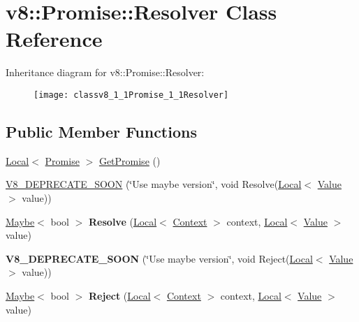 \hypertarget{classv8_1_1Promise_1_1Resolver}{}\section{v8\+:\+:Promise\+:\+:Resolver Class Reference}
\label{classv8_1_1Promise_1_1Resolver}
Inheritance diagram for v8\+:\+:Promise\+:\+:Resolver\+:\begin{figure}[H]
\begin{center}
\leavevmode
\texttt{[image: classv8\_1\_1Promise\_1\_1Resolver]}
\end{center}
\end{figure}
\subsection*{Public Member Functions}
\begin{DoxyCompactItemize}
\item 
\hyperlink{classv8_1_1Local}{Local}$<$ \hyperlink{classv8_1_1Promise}{Promise} $>$ \hyperlink{classv8_1_1Promise_1_1Resolver_a41fd1ffef546a62e363a639935fc8ae3}{Get\+Promise} ()
\item 
\hyperlink{classv8_1_1Promise_1_1Resolver_aff632d8369ba1198d0ce9f0072d278e7}{V8\+\_\+\+D\+E\+P\+R\+E\+C\+A\+T\+E\+\_\+\+S\+O\+ON} (\char`\"{}Use maybe version\char`\"{}, void Resolve(\hyperlink{classv8_1_1Local}{Local}$<$ \hyperlink{classv8_1_1Value}{Value} $>$ value))
\item 
\hyperlink{classv8_1_1Maybe}{Maybe}$<$ bool $>$ {\bfseries Resolve} (\hyperlink{classv8_1_1Local}{Local}$<$ \hyperlink{classv8_1_1Context}{Context} $>$ context, \hyperlink{classv8_1_1Local}{Local}$<$ \hyperlink{classv8_1_1Value}{Value} $>$ value)\hypertarget{classv8_1_1Promise_1_1Resolver_ad76163f1f6fb4c83eecb27bbe933f817}{}\label{classv8_1_1Promise_1_1Resolver_ad76163f1f6fb4c83eecb27bbe933f817}

\item 
{\bfseries V8\+\_\+\+D\+E\+P\+R\+E\+C\+A\+T\+E\+\_\+\+S\+O\+ON} (\char`\"{}Use maybe version\char`\"{}, void Reject(\hyperlink{classv8_1_1Local}{Local}$<$ \hyperlink{classv8_1_1Value}{Value} $>$ value))\hypertarget{classv8_1_1Promise_1_1Resolver_a56f20403d52528a8c06d8f3aa5fc1540}{}\label{classv8_1_1Promise_1_1Resolver_a56f20403d52528a8c06d8f3aa5fc1540}

\item 
\hyperlink{classv8_1_1Maybe}{Maybe}$<$ bool $>$ {\bfseries Reject} (\hyperlink{classv8_1_1Local}{Local}$<$ \hyperlink{classv8_1_1Context}{Context} $>$ context, \hyperlink{classv8_1_1Local}{Local}$<$ \hyperlink{classv8_1_1Value}{Value} $>$ value)\hypertarget{classv8_1_1Promise_1_1Resolver_a548fa238787f87e793fd3eca143a3508}{}\label{classv8_1_1Promise_1_1Resolver_a548fa238787f87e793fd3eca143a3508}

\end{DoxyCompactItemize}
